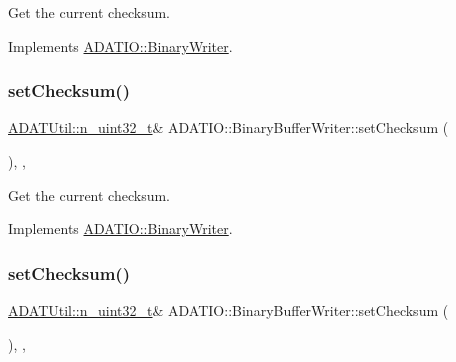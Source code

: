 Get the current checksum. 



Implements \mbox{\hyperlink{classADATIO_1_1BinaryWriter_ae64230370824192d1f0dbcaa8e74017a}{A\+D\+A\+T\+I\+O\+::\+Binary\+Writer}}.

\mbox{\label{classADATIO_1_1BinaryBufferWriter_af4cc523a862ce29a96f1a813f254360e}} 
\subsubsection{\texorpdfstring{setChecksum()}{setChecksum()}\hspace{0.1cm}{\footnotesize\ttfamily [2/3]}}
{\footnotesize\ttfamily \mbox{\hyperlink{namespaceADATUtil_ad945a8afa4db2d1f89b731964adae97e}{A\+D\+A\+T\+Util\+::n\+\_\+uint32\+\_\+t}}\& A\+D\+A\+T\+I\+O\+::\+Binary\+Buffer\+Writer\+::set\+Checksum (\begin{DoxyParamCaption}{ }\end{DoxyParamCaption})\hspace{0.3cm}{\ttfamily [inline]}, {\ttfamily [protected]}, {\ttfamily [virtual]}}



Get the current checksum. 



Implements \mbox{\hyperlink{classADATIO_1_1BinaryWriter_ae64230370824192d1f0dbcaa8e74017a}{A\+D\+A\+T\+I\+O\+::\+Binary\+Writer}}.

\mbox{\label{classADATIO_1_1BinaryBufferWriter_af4cc523a862ce29a96f1a813f254360e}} 
\subsubsection{\texorpdfstring{setChecksum()}{setChecksum()}\hspace{0.1cm}{\footnotesize\ttfamily [3/3]}}
{\footnotesize\ttfamily \mbox{\hyperlink{namespaceADATUtil_ad945a8afa4db2d1f89b731964adae97e}{A\+D\+A\+T\+Util\+::n\+\_\+uint32\+\_\+t}}\& A\+D\+A\+T\+I\+O\+::\+Binary\+Buffer\+Writer\+::set\+Checksum (\begin{DoxyParamCaption}{ }\end{DoxyParamCaption})\hspace{0.3cm}{\ttfamily [inline]}, {\ttfamily [protected]}, {\ttfamily [virtual]}}



